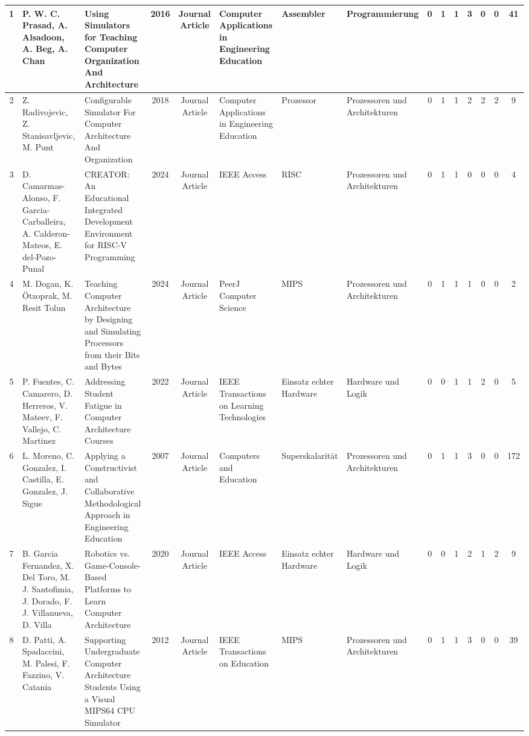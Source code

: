 \begin{landscape}
\begin{longtable}{|c|p{2cm}|p{2cm}|c|c|p{2cm}|p{1cm}|p{1cm}|c|c|c|c|c|c|c|}
    1 & P. W. C. Prasad, A. Alsadoon, A. Beg, A. Chan  & Using Simulators for Teaching Computer Organization And Architecture & 2016 & Journal Article & Computer Applications in Engineering Education & Assembler & Programmierung & 0 & 1 & 1 & 3 & 0 & 0 & 41 \\ \hline
    2 & Z. Radivojevic, Z. Stanisavljevic, M. Punt & Configurable Simulator For Computer Architecture And Organization & 2018 & Journal Article & Computer Applications in Engineering Education & Prozessor & Prozessoren und Architekturen & 0 & 1 & 1 & 2 & 2 & 2 & 9 \\ \hline
    3 & D. Camarmas-Alonso,  F. Garcia-Carballeira,  A. Calderon-Mateos,  E. del-Pozo-Punal & CREATOR: An Educational Integrated Development Environment for RISC-V Programming & 2024 & Journal Article & IEEE Access & RISC & Prozessoren und Architekturen & 0 & 1 & 1 & 0 & 0 & 0 & 4 \\ \hline
    4 & M. Dogan, K. Ötzoprak, M. Resit Tolun & Teaching Computer Architecture by Designing and Simulating Processors from their Bits and Bytes & 2024 & Journal Article & PeerJ Computer Science & MIPS & Prozessoren und Architekturen & 0 & 1 & 1 & 1 & 0 & 0 & 2 \\ \hline
    5 & P. Fuentes, C. Camarero, D. Herreros, V. Mateev, F. Vallejo, C. Martinez & Addressing Student Fatigue in Computer Architecture Courses & 2022 & Journal Article & IEEE Transactions on Learning Technologies & Einsatz echter Hardware & Hardware und Logik & 0 & 0 & 1 & 1 & 2 & 0 & 5 \\ \hline
    6 & L. Moreno, C. Gonzalez, I. Castilla, E. Gonzalez, J. Sigue & Applying a Constructivist and Collaborative Methodological Approach in Engineering Education & 2007 & Journal Article & Computers and Education & Superskalarität & Prozessoren und Architekturen & 0 & 1 & 1 & 3 & 0 & 0 & 172 \\ \hline
    7 & B. Garcia Fernandez, X. Del Toro, M. J. Santofimia, J. Dorado, F. J. Villanueva, D. Villa & Robotics vs. Game-Console-Based Platforms to Learn Computer Architecture & 2020 & Journal Article & IEEE Access & Einsatz echter Hardware & Hardware und Logik & 0 & 0 & 1 & 2 & 1 & 2 & 9 \\ \hline
    8 & D. Patti, A. Spadaccini, M. Palesi, F. Fazzino, V. Catania & Supporting Undergraduate Computer Architecture Students Using a Visual MIPS64 CPU Simulator & 2012 & Journal Article & IEEE Transactions on Education & MIPS & Prozessoren und Architekturen & 0 & 1 & 1 & 3 & 0 & 0 & 39 \\ \hline

\end{longtable}
\end{landscape}
